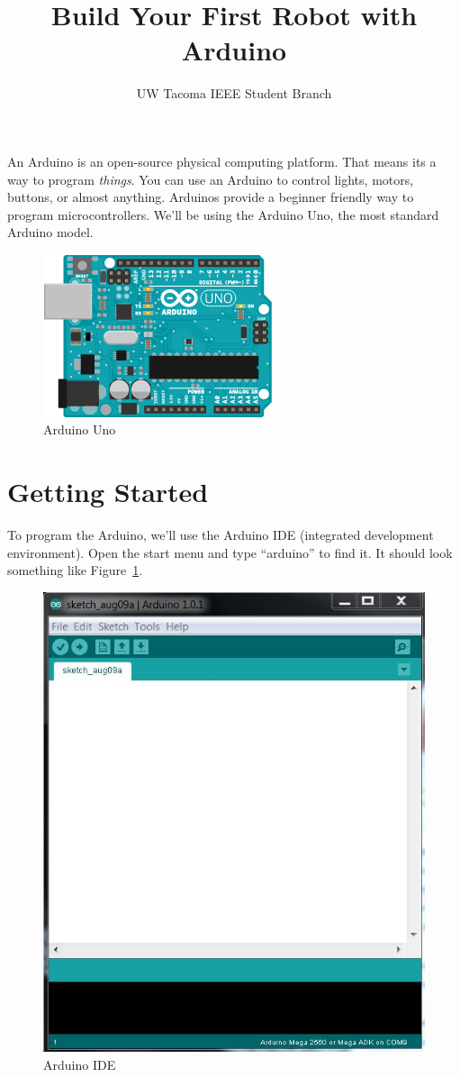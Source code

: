 \documentclass[letterpaper]{article}
\title{Build Your First Robot with Arduino}
\author{UW Tacoma IEEE Student Branch}
\begin{document}
\maketitle

An Arduino is an open-source physical computing platform.
That means its a way to program \emph{things}.
You can use an Arduino to control lights, motors, buttons, or almost anything.
Arduinos provide a beginner friendly way to program microcontrollers.
We'll be using the Arduino Uno,
the most standard Arduino model.

\begin{figure}[h!]
    \center
    \includegraphics[width=.5\textwidth]{uno.png}
    \caption{Arduino Uno}
\end{figure}

\section{Getting Started}
\label{sec:getting_started}

To program the Arduino,
we'll use the Arduino IDE (integrated development environment).
Open the start menu and type ``arduino'' to find it.
It should look something like Figure~\ref{fig:ide}.

\begin{figure}[h!]
    \center
    \includegraphics[width=.5\textwidth]{ide.jpg}
    \caption{Arduino IDE}
    \label{fig:ide}
\end{figure}
\end{document}
